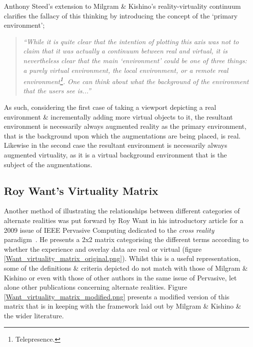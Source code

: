 Anthony Steed's extension to Milgram \& Kishino's reality-virtuality continuum clarifies the fallacy of this thinking by introducing the concept of the `primary environment';

\begin{quote}
\textit{``While it is quite clear that the intention of plotting this axis was not to claim that it was actually a continuum between real and virtual, it is nevertheless clear that the main `environment' could be one of three things: a purely virtual environment, the local environment, or a remote real environment\footnote{Telepresence.}. One can think about what the background of the environment that the users see is...''}~\cite{Steed2014}
\end{quote}

As such, considering the first case of taking a viewport depicting a real environment \& incrementally adding more virtual objects to it, the resultant environment is necessarily always augmented reality as the primary environment, that is the background upon which the augmentations are being placed, is real. Likewise in the second case the resultant environment is necessarily always augmented virtuality, as it is a virtual background environment that is the subject of the augmentations.


\subsection{Roy Want's Virtuality Matrix}

Another method of illustrating the relationships between different categories of alternate realities was put forward by Roy Want in his introductory article for a 2009 issue of IEEE Pervasive Computing dedicated to the \textit{cross reality} paradigm~\cite{Want2009}. He presents a 2x2 matrix categorising the different terms according to whether the experience and overlay data are real or virtual (figure \ref{Want_virtuality_matrix_original.png}). Whilst this is a useful representation, some of the definitions \& criteria depicted do not match with those of Milgram \& Kishino or even with those of other authors in the same issue of Pervasive, let alone other publications concerning alternate realities. Figure \ref{Want_virtuality_matrix_modified.png} presents a modified version of this matrix that is in keeping with the framework laid out by Milgram \& Kishino \& the wider literature.

